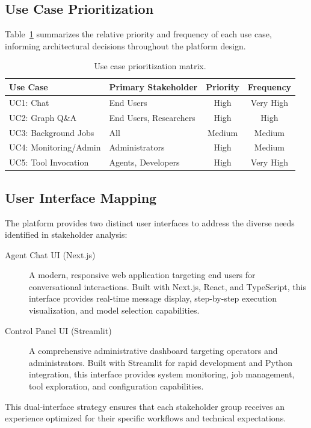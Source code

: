 \subsection{Use Case Prioritization}

Table~\ref{tab:use-case-priority} summarizes the relative priority and frequency of each use case, informing architectural decisions throughout the platform design.

\begin{table}[ht]
\centering
\caption{Use case prioritization matrix.}
\label{tab:use-case-priority}
\small
\begin{tabular}{llcc}
\hline
\textbf{Use Case} & \textbf{Primary Stakeholder} & \textbf{Priority} & \textbf{Frequency} \\
\hline
UC1: Chat & End Users & High & Very High \\
UC2: Graph Q\&A & End Users, Researchers & High & High \\
UC3: Background Jobs & All & Medium & Medium \\
UC4: Monitoring/Admin & Administrators & High & Medium \\
UC5: Tool Invocation & Agents, Developers & High & Very High \\
\hline
\end{tabular}
\end{table}

\subsection{User Interface Mapping}

The platform provides two distinct user interfaces to address the diverse needs identified in stakeholder analysis:

\begin{description}
    \item[Agent Chat UI (Next.js)] A modern, responsive web application targeting end users for conversational interactions. Built with Next.js, React, and TypeScript, this interface provides real-time message display, step-by-step execution visualization, and model selection capabilities.
    
    \item[Control Panel UI (Streamlit)] A comprehensive administrative dashboard targeting operators and administrators. Built with Streamlit for rapid development and Python integration, this interface provides system monitoring, job management, tool exploration, and configuration capabilities.
\end{description}

This dual-interface strategy ensures that each stakeholder group receives an experience optimized for their specific workflows and technical expectations.

